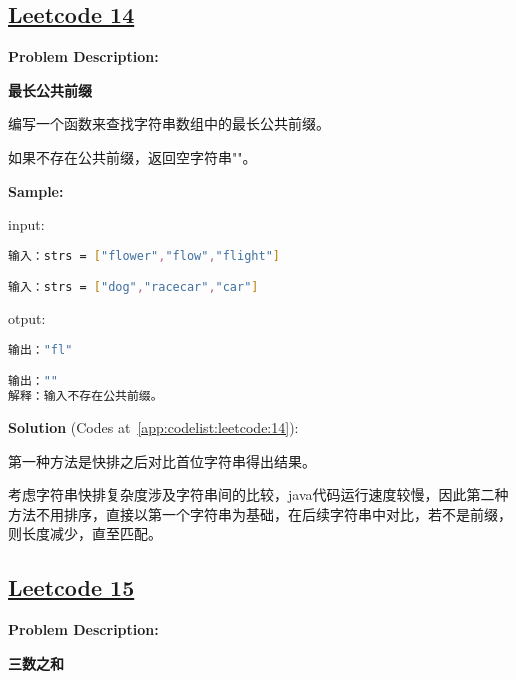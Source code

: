 \subsection{\href{https://leetcode-cn.com/}{Leetcode 14}}\label{app:problemlist:leetcode:14}

\textbf{Problem Description:}\par

\textbf{最长公共前缀}\par

编写一个函数来查找字符串数组中的最长公共前缀。\par

如果不存在公共前缀，返回空字符串""。\par


\textbf{Sample:}\par

input:\par

\begin{lstlisting}[language=bash]
输入：strs = ["flower","flow","flight"]

输入：strs = ["dog","racecar","car"]
\end{lstlisting}

otput:\par

\begin{lstlisting}[language=bash]
输出："fl"

输出：""
解释：输入不存在公共前缀。
\end{lstlisting}

\textbf{Solution }(Codes at~\ref{app:codelist:leetcode:14}):\par

第一种方法是快排之后对比首位字符串得出结果。\par

考虑字符串快排复杂度涉及字符串间的比较，java代码运行速度较慢，因此第二种方法不用排序，直接以第一个字符串为基础，在后续字符串中对比，若不是前缀，则长度减少，直至匹配。\par



\subsection{\href{https://leetcode-cn.com/}{Leetcode 15}}\label{app:problemlist:leetcode:15}

\textbf{Problem Description:}\par

\textbf{三数之和}\par


